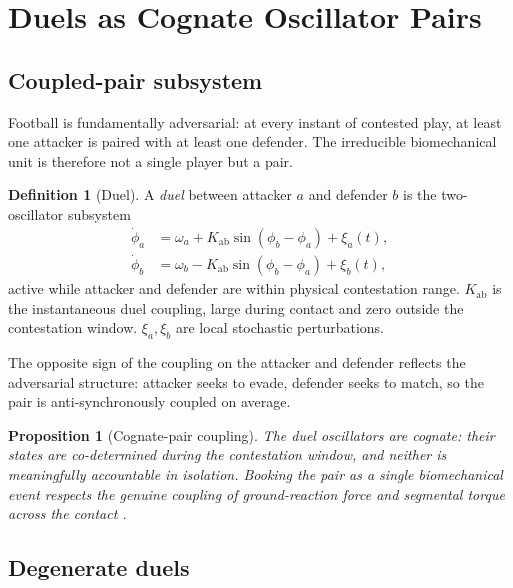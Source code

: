 \documentclass[11pt,twocolumn,a4paper]{article}
\newtheorem{proposition}[theorem]{Proposition}
\theoremstyle{definition}
\newtheorem{definition}[theorem]{Definition}
\theoremstyle{remark}
\begin{document}
\section{Duels as Cognate Oscillator Pairs}
\label{sec:cognate}

\subsection{Coupled-pair subsystem}

Football is fundamentally adversarial: at every instant of contested
play, at least one attacker is paired with at least one defender. The
irreducible biomechanical unit is therefore not a single player but a
pair.

\begin{definition}[Duel]
\label{def:duel}
A \emph{duel} between attacker $a$ and defender $b$ is the
two-oscillator subsystem
\begin{align}
  \dot{\phi}_a &= \omega_a + K_{\mathrm{ab}} \sin(\phi_b - \phi_a) + \xi_a(t), \\
  \dot{\phi}_b &= \omega_b - K_{\mathrm{ab}} \sin(\phi_b - \phi_a) + \xi_b(t),
  \label{eq:duel}
\end{align}
active while attacker and defender are within physical contestation
range. $K_{\mathrm{ab}}$ is the instantaneous duel coupling, large
during contact and zero outside the contestation window.
$\xi_a, \xi_b$ are local stochastic perturbations.
\end{definition}

The opposite sign of the coupling on the attacker and defender reflects
the adversarial structure: attacker seeks to evade, defender seeks to
match, so the pair is anti-synchronously coupled on average.

\begin{proposition}[Cognate-pair coupling]
\label{prop:cognate}
The duel oscillators are \emph{cognate}: their states are co-determined
during the contestation window, and neither is meaningfully accountable
in isolation. Booking the pair as a single biomechanical event respects
the genuine coupling of ground-reaction force and segmental torque
across the contact \citep{novacheck1998,winter2009}.
\end{proposition}

\subsection{Degenerate duels}
\end{document}
